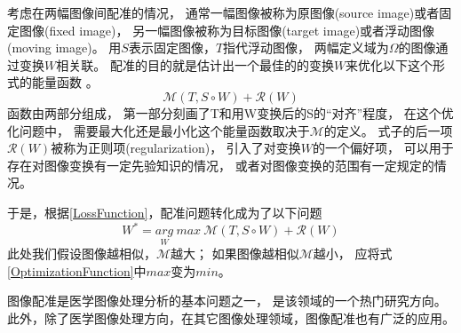 考虑在两幅图像间配准的情况，
通常一幅图像被称为原图像(source image)或者固定图像(fixed image)，
另一幅图像被称为目标图像(target image)或者浮动图像(moving image)。
用$S$表示固定图像，$T$指代浮动图像，
两幅定义域为$\Omega$的图像通过变换$W$相关联。
配准的目的就是估计出一个最佳的的变换$W$来优化以下这个形式的能量函数
。
\begin{equation}\label{LossFunction}
\mathcal{M}(T,S\circ W)+\mathcal{R}(W)
\end{equation}
函数由两部分组成，
第一部分刻画了T和用W变换后的S的``对齐''程度，
在这个优化问题中，
需要最大化还是最小化这个能量函数取决于$\mathcal{M}$的定义。
式子的后一项$\mathcal{R}(W)$被称为正则项(regularization)，
引入了对变换$W$的一个偏好项，
可以用于存在对图像变换有一定先验知识的情况，
或者对图像变换的范围有一定规定的情况。

于是，根据\ref{LossFunction}，配准问题转化成为了以下问题
\begin{equation}\label{OptimizationFunction}
  W^\ast=\underset{W}{arg} \ max \ \mathcal{M}(T,S\circ W)+\mathcal{R}(W)
\end{equation}
此处我们假设图像越相似，$\mathcal{M}$越大；
如果图像越相似$\mathcal{M}$越小，
应将式\ref{OptimizationFunction}中$max$变为$min$。


图像配准是医学图像处理分析的基本问题之一，
是该领域的一个热门研究方向。
此外，除了医学图像处理方向，在其它图像处理领域，图像配准也有广泛的应用。

